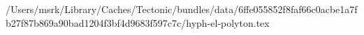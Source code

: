 /Users/msrk/Library/Caches/Tectonic/bundles/data/6ffe055852f8faf66c0acbe1a7fb27f87b869a90bad1204f3bf4d9683f597c7c/hyph-el-polyton.tex